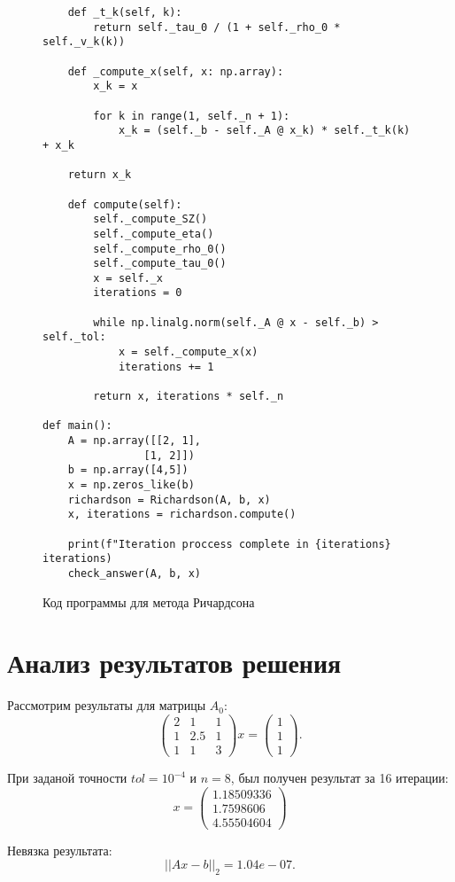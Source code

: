 \documentclass[a4paper,12pt]{article}
\begin{document}
		\begin{figure}[h]
		\begin{verbatim}
	def _t_k(self, k):
		return self._tau_0 / (1 + self._rho_0 * self._v_k(k))

	def _compute_x(self, x: np.array):
		x_k = x
		
		for k in range(1, self._n + 1):
			x_k = (self._b - self._A @ x_k) * self._t_k(k) + x_k
	
	return x_k
	
	def compute(self):
		self._compute_SZ()
		self._compute_eta()
		self._compute_rho_0()
		self._compute_tau_0()
		x = self._x
		iterations = 0
		
		while np.linalg.norm(self._A @ x - self._b) > self._tol:
			x = self._compute_x(x)
			iterations += 1
			
		return x, iterations * self._n

def main():
	A = np.array([[2, 1],
				[1, 2]])
	b = np.array([4,5])
	x = np.zeros_like(b)
	richardson = Richardson(A, b, x)
	x, iterations = richardson.compute()
	
	print(f"Iteration proccess complete in {iterations} iterations)
	check_answer(A, b, x)
		\end{verbatim}
		\caption{Код программы для метода Ричардсона}
	\end{figure}
	\newpage
	\section{Анализ результатов решения}
	Рассмотрим результаты для матрицы $A_0$:
		\[
	\begin{pmatrix}
		2 & 1 & 1 \\
		1 & 2.5 & 1 \\
		1 & 1 & 3
	\end{pmatrix} x = 
	\begin{pmatrix}
		1\\
		1\\
		1
	\end{pmatrix}.
	\]
	
	При заданой точности $tol=10^{-4}$ и $n=8$, был получен результат за 16 итерации:
	\[
		x = 
		\begin{pmatrix}
			1.18509336\\ 1.7598606  \\4.55504604
		\end{pmatrix}
	\]
	
		Невязка результата\cite{mathcalc}:
		\[
			||Ax - b||_2 = 1.04e-07.
		\]
		
\end{document}

